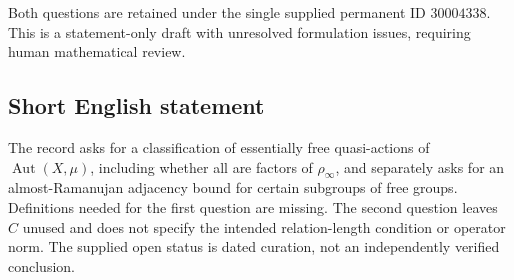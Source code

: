 \documentclass[11pt]{article}
\begin{document}
Both questions are retained under the single supplied permanent ID \(30004338\). This is a statement-only draft with unresolved formulation issues, requiring human mathematical review.
\subsection{Short English statement}
The record asks for a classification of essentially free quasi-actions of \(\operatorname{Aut}(X,\mu)\), including whether all are factors of \(\rho_\infty\), and separately asks for an almost-Ramanujan adjacency bound for certain subgroups of free groups. Definitions needed for the first question are missing. The second question leaves \(C\) unused and does not specify the intended relation-length condition or operator norm. The supplied open status is dated curation, not an independently verified conclusion.
\end{document}

